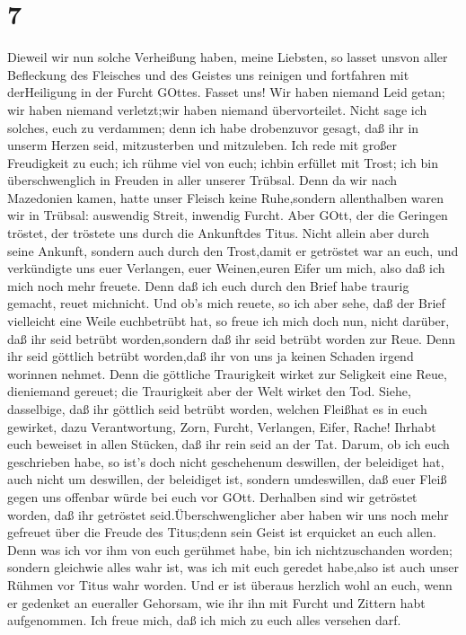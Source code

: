\hypertarget{section-6}{%
\section{7}\label{section-6}}

 Dieweil wir nun solche Verheißung haben, meine Liebsten, so
lasset unsvon aller Befleckung des Fleisches und des Geistes uns
reinigen und fortfahren mit derHeiligung in der Furcht GOttes.
 Fasset uns! Wir haben niemand Leid getan; wir haben niemand
verletzt;wir haben niemand übervorteilet.  Nicht sage ich
solches, euch zu verdammen; denn ich habe drobenzuvor gesagt, daß ihr in
unserm Herzen seid, mitzusterben und mitzuleben.  Ich rede
mit großer Freudigkeit zu euch; ich rühme viel von euch; ichbin erfüllet
mit Trost; ich bin überschwenglich in Freuden in aller unserer Trübsal.
 Denn da wir nach Mazedonien kamen, hatte unser Fleisch
keine Ruhe,sondern allenthalben waren wir in Trübsal: auswendig Streit,
inwendig Furcht.  Aber GOtt, der die Geringen tröstet, der
tröstete uns durch die Ankunftdes Titus.  Nicht allein aber
durch seine Ankunft, sondern auch durch den Trost,damit er getröstet war
an euch, und verkündigte uns euer Verlangen, euer Weinen,euren Eifer um
mich, also daß ich mich noch mehr freuete.  Denn daß ich
euch durch den Brief habe traurig gemacht, reuet michnicht. Und ob's
mich reuete, so ich aber sehe, daß der Brief vielleicht eine Weile
euchbetrübt hat,  so freue ich mich doch nun, nicht darüber,
daß ihr seid betrübt worden,sondern daß ihr seid betrübt worden zur
Reue. Denn ihr seid göttlich betrübt worden,daß ihr von uns ja keinen
Schaden irgend worinnen nehmet.  Denn die göttliche
Traurigkeit wirket zur Seligkeit eine Reue, dieniemand gereuet; die
Traurigkeit aber der Welt wirket den Tod.  Siehe,
dasselbige, daß ihr göttlich seid betrübt worden, welchen Fleißhat es in
euch gewirket, dazu Verantwortung, Zorn, Furcht, Verlangen, Eifer,
Rache! Ihrhabt euch beweiset in allen Stücken, daß ihr rein seid an der
Tat.  Darum, ob ich euch geschrieben habe, so ist's doch
nicht geschehenum deswillen, der beleidiget hat, auch nicht um
deswillen, der beleidiget ist, sondern umdeswillen, daß euer Fleiß gegen
uns offenbar würde bei euch vor GOtt.  Derhalben sind wir
getröstet worden, daß ihr getröstet seid.Überschwenglicher aber haben
wir uns noch mehr gefreuet über die Freude des Titus;denn sein Geist ist
erquicket an euch allen.  Denn was ich vor ihm von euch
gerühmet habe, bin ich nichtzuschanden worden; sondern gleichwie alles
wahr ist, was ich mit euch geredet habe,also ist auch unser Rühmen vor
Titus wahr worden.  Und er ist überaus herzlich wohl an
euch, wenn er gedenket an eueraller Gehorsam, wie ihr ihn mit Furcht und
Zittern habt aufgenommen.  Ich freue mich, daß ich mich zu
euch alles versehen darf.

